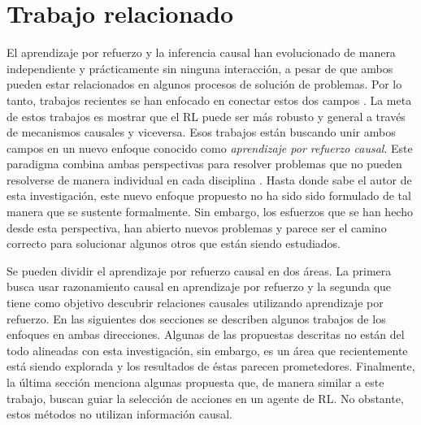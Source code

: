 \chapter{Trabajo relacionado}\label{chapter3}

\graphicspath{{Chapter3/Figs/}}


El aprendizaje por refuerzo y la inferencia
causal han evolucionado de manera 
independiente y prácticamente sin 
ninguna interacción, a pesar de que ambos
pueden estar relacionados en algunos
procesos de solución de problemas.
Por lo tanto, trabajos recientes
se han enfocado en conectar estos dos
campos  \cite{Gershman2017, 6-DBLP:journals/midm/YuDLR19, lu2018deconfounding, dasgupta2019causal}. La meta de estos trabajos es mostrar que el RL puede ser más robusto y general a través de mecanismos
causales y viceversa.
Esos trabajos están buscando unir ambos
campos en un nuevo enfoque conocido como
\textit{aprendizaje por refuerzo causal}. Este paradigma combina
ambas perspectivas para resolver problemas que no pueden
resolverse de manera individual en cada disciplina \cite{CausalRL2019EliasB, chaochao_2019}.
Hasta donde sabe el autor de esta investigación, este nuevo enfoque propuesto no ha sido sido formulado de tal manera que se sustente formalmente.
Sin embargo, los esfuerzos que se han hecho desde esta perspectiva, han abierto
nuevos problemas y parece ser el camino correcto para solucionar algunos otros
que están siendo estudiados.


Se pueden dividir el aprendizaje por refuerzo causal
en dos áreas. La primera busca usar razonamiento causal en aprendizaje por refuerzo y la segunda que tiene como objetivo descubrir relaciones causales utilizando aprendizaje por refuerzo. En las siguientes dos secciones se describen
algunos trabajos de los enfoques en ambas direcciones. Algunas de las
propuestas descritas no están del todo alineadas con esta investigación, sin embargo, es un área que recientemente está siendo explorada y los resultados de éstas parecen prometedores.
Finalmente, la última sección menciona algunas propuesta que, de manera similar a este trabajo, buscan guiar la selección de acciones en un agente de RL. No obstante, estos métodos no utilizan información causal.


